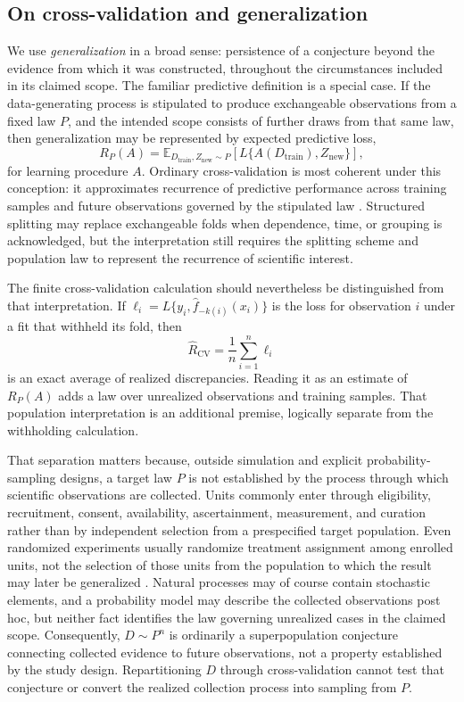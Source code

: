 \documentclass[11pt]{article}
\newcommand{\E}{\mathbb{E}}
\theoremstyle{remark}
\begin{document}
\subsection{On cross-validation and generalization}
\label{sec:cross-validation}

We use \emph{generalization} in a broad sense: persistence of a conjecture
beyond the evidence from which it was constructed, throughout the
circumstances included in its claimed scope. The familiar predictive
definition is a special case. If the data-generating process is stipulated to
produce exchangeable observations from a fixed law $P$, and the intended scope
consists of further draws from that same law, then generalization may be
represented by expected predictive loss,
\[
R_P(A)
=
\E_{D_{\mathrm{train}},Z_{\mathrm{new}}\sim P}
\left[
L\{A(D_{\mathrm{train}}),Z_{\mathrm{new}}\}
\right],
\]
for learning procedure $A$. Ordinary cross-validation is most coherent under
this conception: it approximates recurrence of predictive performance across
training samples and future observations governed by the stipulated law
\cite{arlot2010survey,bengio2004variance}. Structured splitting may replace
exchangeable folds when dependence, time, or grouping is acknowledged, but the
interpretation still requires the splitting scheme and population law to
represent the recurrence of scientific interest.

The finite cross-validation calculation should nevertheless be distinguished
from that interpretation. If
$\ell_i=L\{y_i,\hat f_{-k(i)}(x_i)\}$ is the loss for observation $i$ under a
fit that withheld its fold, then
\[
\widehat R_{\mathrm{CV}}
=
\frac{1}{n}\sum_{i=1}^n\ell_i
\]
is an exact average of realized discrepancies. Reading it as an estimate of
$R_P(A)$ adds a law over unrealized observations and training samples. That
population interpretation is an additional premise, logically separate from
the withholding calculation.

That separation matters because, outside simulation and explicit
probability-sampling designs, a target law $P$ is not established by the
process through which scientific observations are collected. Units commonly
enter through eligibility, recruitment, consent, availability, ascertainment,
measurement, and curation rather than by independent selection from a
prespecified target population. Even randomized experiments usually randomize
treatment assignment among enrolled units, not the selection of those units
from the population to which the result may later be generalized
\cite{stuart2018generalizability,westreich2017transportability}. Natural
processes may of course contain stochastic elements, and a probability model
may describe the collected observations post hoc, but neither fact identifies
the law governing unrealized cases in the claimed scope. Consequently,
$D\sim P^n$ is ordinarily a superpopulation conjecture connecting collected
evidence to future observations, not a property established by the study
design. Repartitioning $D$ through cross-validation cannot test that conjecture
or convert the realized collection process into sampling from $P$.
\end{document}
